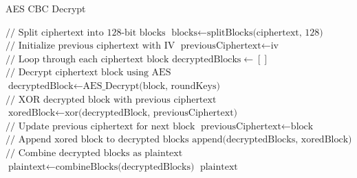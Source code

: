 \documentclass[12pt,twocolumn]{article}
\begin{document}
\begin{algorithm}
\caption{AES CBC Decrypt}
\begin{algorithmic}
  \State $ \text{// Split ciphertext into 128-bit blocks} $
  \State $ \text{blocks} \gets \text{splitBlocks(ciphertext, 128)} $
  \State $ \text{// Initialize previous ciphertext with IV} $
  \State $ \text{previousCiphertext} \gets \text{iv} $
  \State $ \text{// Loop through each ciphertext block} $
  \State $ \text{decryptedBlocks} \gets [] $
    \State $ \text{// Decrypt ciphertext block using AES} $
    \State $ \text{decryptedBlock} \gets \text{AES\_Decrypt(block, roundKeys)} $
    \State $ \text{// XOR decrypted block with previous ciphertext} $
    \State $ \text{xoredBlock} \gets \text{xor(decryptedBlock, previousCiphertext)} $
    \State $ \text{// Update previous ciphertext for next block} $
    \State $ \text{previousCiphertext} \gets \text{block} $
    \State $ \text{// Append xored block to decrypted blocks} $
    \State $ \text{append(decryptedBlocks, xoredBlock)} $
  \EndFor
  \State $ \text{// Combine decrypted blocks as plaintext} $
  \State $ \text{plaintext} \gets \text{combineBlocks(decryptedBlocks)} $
  \State \Return $\text{plaintext}$
\EndFunction
\end{algorithmic}
\end{algorithm}


\twocolumn[
    \printbibliography
]
\end{document}
